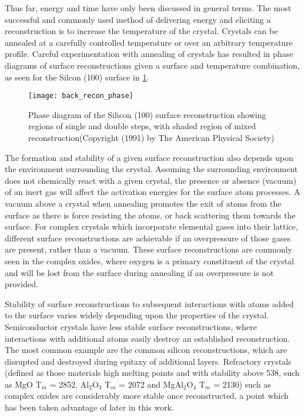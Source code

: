 Thus far, energy and time have only been discussed in general terms.
The most successful and commonly used method of delivering energy and eliciting a reconstruction is to increase the temperature of the crystal.
Crystals can be annealed at a carefully controlled temperature or over an arbitrary temperature profile.
Careful experimentation with annealing of crystals has resulted in phase diagrams of surface reconstructions given a surface and temperature combination, as seen for the Silcon (100) surface in \cref{fig:back_recon_phase}.
\begin{figure}
 \centering \texttt{[image: back\_recon\_phase]}
 \caption[Silicon surface reconstruction phase diagram]{\label{fig:back_recon_phase}Phase diagram of the Silicon (100) surface reconstruction showing regions of single and double steps, with shaded region of mixed reconstruction\cite{Pehlke1991}(Copyright (1991) by The American Physical Society)}
\end{figure}

The formation and stability of a given surface reconstruction also depends upon the environment surrounding the crystal.
Assuming the surrounding environment does not chemically react with a given crystal, the presence or absence (vacuum) of an inert gas will affect the activation energies for the surface atom processes.
A vacuum above a crystal when annealing promotes the exit of atoms from the surface as there is force resisting the atoms, or back scattering them towards the surface.
For complex crystals which incorporate elemental gases into their lattice, different surface reconstructions are achievable if an overpressure of those gases are present, rather than a vacuum.
These surface reconstructions are commonly seen in the complex oxides, where oxygen is a primary constituent of the crystal and will be lost from the surface during annealing if an overpressure is not provided.

Stability of surface reconstructions to subsequent interactions with atoms added to the surface varies widely depending upon the properties of the crystal.
Semiconductor crystals have less stable surface reconstructions, where interactions with additional atoms easily destroy an established reconstruction.
The most common example are the common silicon reconstructions, which are disrupted and destroyed during epitaxy of additional layers.
Refractory crystals (defined as those materials high melting points and with stability above 538\celsius{}\cite{ASTMC71}, such as MgO T\(_m\) = 2852\celsius{}, Al\(_2\)O\(_3\) T\(_m\) = 2072\celsius{} and MgAl\(_2\)O\(_4\) T\(_m\) = 2130\celsius{}) such as complex oxides are considerably more stable once reconstructed, a point which has been taken advantage of later in this work.

